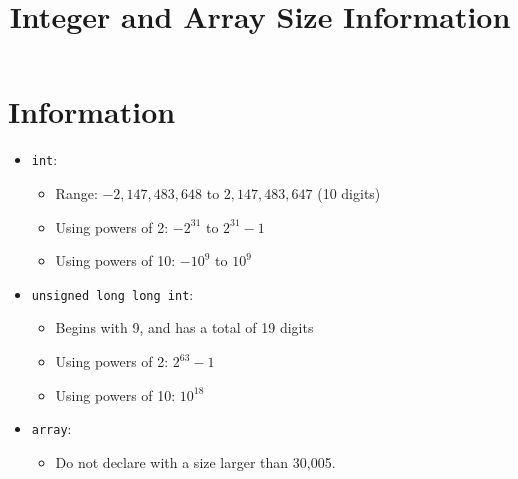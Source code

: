\documentclass{article}
\begin{document}
\title{Integer and Array Size Information}
\author{}
\date{}
\maketitle

\section*{Information}
\begin{itemize}
    \item \texttt{int}:
    \begin{itemize}
        \item Range: $-2,147,483,648$ to $2,147,483,647$ (10 digits)
        \item Using powers of 2: $-2^{31}$ to $2^{31} - 1$
        \item Using powers of 10: $-10^9$ to $10^9$
    \end{itemize}
    
    \item \texttt{unsigned long long int}:
    \begin{itemize}
        \item Begins with 9, and has a total of 19 digits
        \item Using powers of 2: $2^{63} - 1$
        \item Using powers of 10: $10^{18}$
    \end{itemize}
    
    \item \texttt{array}:
    \begin{itemize}
        \item Do not declare with a size larger than 30,005.
    \end{itemize}
\end{itemize}
\end{document}
